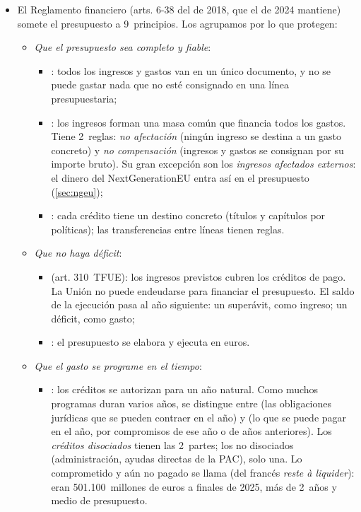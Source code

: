 \documentclass[11pt]{article}
\begin{document}
\begin{itemize}
\item El Reglamento financiero (arts. 6-38 del de 2018, que el de 2024 mantiene) somete el presupuesto a 9~principios\nocite{UE2024ReglamentoFinanciero,PE2026FichaPresupuesto}. Los agrupamos por lo que protegen:
  \begin{itemize}
  \item \emph{Que el presupuesto sea completo y fiable}:
    \begin{itemize}
    \item {}: todos los ingresos y gastos van en un único documento, y no se puede gastar nada que no esté consignado en una línea presupuestaria;
    \item {}: los ingresos forman una masa común que financia todos los gastos. Tiene 2~reglas: \emph{no afectación} (ningún ingreso se destina a un gasto concreto) y \emph{no compensación} (ingresos y gastos se consignan por su importe bruto). Su gran excepción son los \emph{ingresos afectados externos}: el dinero del NextGenerationEU entra así en el presupuesto (\ref{sec:ngeu});
    \item {}: cada crédito tiene un destino concreto (títulos y capítulos por políticas); las transferencias entre líneas tienen reglas.
    \end{itemize}
  \item \emph{Que no haya déficit}:
    \begin{itemize}
    \item {} (art. 310~TFUE): los ingresos previstos cubren los créditos de pago. La Unión no puede endeudarse para financiar el presupuesto. El saldo de la ejecución pasa al año siguiente: un superávit, como ingreso; un déficit, como gasto;
    \item {}: el presupuesto se elabora y ejecuta en euros.
    \end{itemize}
  \item \emph{Que el gasto se programe en el tiempo}:
    \begin{itemize}
    \item {}: los créditos se autorizan para un año natural. Como muchos programas duran varios años, se distingue entre  (las obligaciones jurídicas que se pueden contraer en el año) y  (lo que se puede pagar en el año, por compromisos de ese año o de años anteriores). Los \emph{créditos disociados} tienen las 2~partes; los no disociados (administración, ayudas directas de la PAC), solo una. Lo comprometido y aún no pagado se llama  (del francés \emph{reste à liquider}): eran 501.100~millones de euros a finales de 2025, más de 2~años y medio de presupuesto\nocite{TCE2026InformeAnual}.

\end{itemize}
\end{itemize}
\end{itemize}
\end{document}
